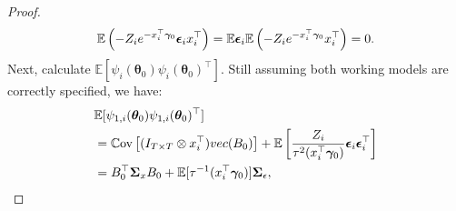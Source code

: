 \documentclass[10pt,a4paper]{amsart}
\newcommand{\Cov}{\mathbb{C}\text{ov}}
\newcommand{\IdenMat}{\textbf{I}}
\newcommand{\LogCoe}{\boldsymbol{\gamma}}
\newcommand{\ObsCov}{\textbf{x}_i}
\newcommand{\vect}{\emph{vec}}
\begin{document}
\begin{proof}
            \begin{equation*}
                \mathbb{E} \left( -Z_i e^{-\ObsCov^{\top} \LogCoe_0} \boldsymbol{\epsilon}_i \ObsCov^{\top} \right) = \mathbb{E}\boldsymbol{\epsilon}_i \mathbb{E}\left( -Z_i e^{-\ObsCov^{\top} \LogCoe_0} \ObsCov^{\top} \right) = \textbf{0}. \\
            \end{equation*}    
        Next, calculate $\mathbb{E} [ \psi_i(\boldsymbol{\theta}_0)\psi_i(\boldsymbol{\theta}_0)^{\top} ] $.
        Still assuming both working models are correctly specified, we have: 
            \begin{align*}
                &\mathbb{E} [ \psi_{1,i}(\boldsymbol{\theta}_0) \psi_{1,i}(\boldsymbol{\theta}_0)^{\top} ] \\ 
                &= \Cov\left[ (\IdenMat_{T \times T} \otimes \ObsCov^{\top})\vect(\textbf{B}_0) \right] + \mathbb{E} \left[ \frac{Z_i}{\tau^2(\ObsCov^{\top}\LogCoe_0)} \boldsymbol{\epsilon}_i\boldsymbol{\epsilon}_i^{\top} \right] \\
                &= \textbf{B}^{\top}_0 \boldsymbol{\Sigma}_{x} \textbf{B}_0 + \mathbb{E} [\tau^{-1}(\ObsCov^{\top}\LogCoe_0)] \boldsymbol{\Sigma}_{\epsilon},
            \end{align*}

\end{proof}
\end{document}
